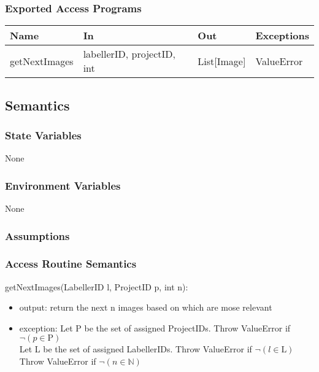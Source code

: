 \documentclass[12pt, titlepage]{article}
\begin{document}
  \subsubsection{Exported Access Programs}
  
  \begin{center}
  \begin{tabular}{p{2cm} p{4cm} p{4cm} p{2cm}}
  \hline
  \textbf{Name} & \textbf{In} & \textbf{Out} & \textbf{Exceptions} \\
  \hline
  getNextImages & labellerID, projectID, int & List[Image] & ValueError \\
  
  \end{tabular}
  \end{center}
  
  \subsection{Semantics}
  
  \subsubsection{State Variables}
  
 None
  
  \subsubsection{Environment Variables}
  
  None
  
  \subsubsection{Assumptions}
  
  
  \subsubsection{Access Routine Semantics}
  
  \noindent getNextImages(LabellerID l, ProjectID p, int n):
  \begin{itemize}
  \item output: return the next n images based on which are mose relevant
  \item exception: Let P be the set of assigned ProjectIDs. Throw ValueError if $\neg (p \in \text{P})$\\
  Let L be the set of assigned LabellerIDs. Throw ValueError if $\neg (l \in \text{L})$\\
  Throw ValueError if $\neg (n \in \mathbb{N})$
  \end{itemize}
\end{document}
